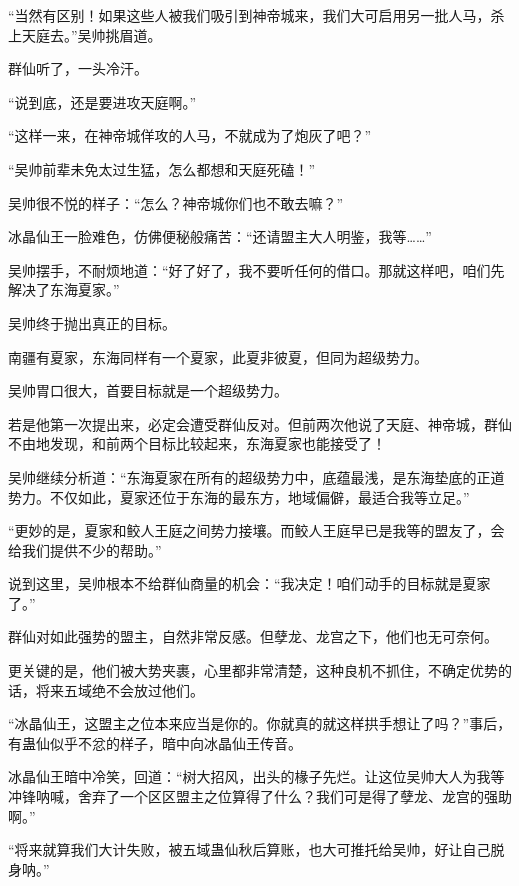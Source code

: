 \begin{this_body}
“当然有区别！如果这些人被我们吸引到神帝城来，我们大可启用另一批人马，杀上天庭去。”吴帅挑眉道。

群仙听了，一头冷汗。

“说到底，还是要进攻天庭啊。”

“这样一来，在神帝城佯攻的人马，不就成为了炮灰了吧？”

“吴帅前辈未免太过生猛，怎么都想和天庭死磕！”

吴帅很不悦的样子：“怎么？神帝城你们也不敢去嘛？”

冰晶仙王一脸难色，仿佛便秘般痛苦：“还请盟主大人明鉴，我等……”

吴帅摆手，不耐烦地道：“好了好了，我不要听任何的借口。那就这样吧，咱们先解决了东海夏家。”

吴帅终于抛出真正的目标。

南疆有夏家，东海同样有一个夏家，此夏非彼夏，但同为超级势力。

吴帅胃口很大，首要目标就是一个超级势力。

若是他第一次提出来，必定会遭受群仙反对。但前两次他说了天庭、神帝城，群仙不由地发现，和前两个目标比较起来，东海夏家也能接受了！

吴帅继续分析道：“东海夏家在所有的超级势力中，底蕴最浅，是东海垫底的正道势力。不仅如此，夏家还位于东海的最东方，地域偏僻，最适合我等立足。”

“更妙的是，夏家和鲛人王庭之间势力接壤。而鲛人王庭早已是我等的盟友了，会给我们提供不少的帮助。”

说到这里，吴帅根本不给群仙商量的机会：“我决定！咱们动手的目标就是夏家了。”

群仙对如此强势的盟主，自然非常反感。但孽龙、龙宫之下，他们也无可奈何。

更关键的是，他们被大势夹裹，心里都非常清楚，这种良机不抓住，不确定优势的话，将来五域绝不会放过他们。

“冰晶仙王，这盟主之位本来应当是你的。你就真的就这样拱手想让了吗？”事后，有蛊仙似乎不忿的样子，暗中向冰晶仙王传音。

冰晶仙王暗中冷笑，回道：“树大招风，出头的椽子先烂。让这位吴帅大人为我等冲锋呐喊，舍弃了一个区区盟主之位算得了什么？我们可是得了孽龙、龙宫的强助啊。”

“将来就算我们大计失败，被五域蛊仙秋后算账，也大可推托给吴帅，好让自己脱身呐。”

\end{this_body}

